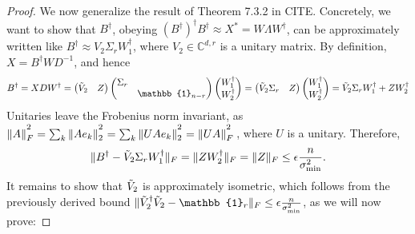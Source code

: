 \begin{proof}
We now generalize the result of Theorem 7.3.2 in CITE. Concretely, we want to show that $B^{\dag}$, obeying $(B^{\dag})^{\dag}B^{\dag}\approx X^* = W\Lambda W^{\dag}$, can be approximately written like $B^{\dag}\approx V_2\Sigma_rW_1^{\dag}$, where $V_2\in\mathbb{C}^{d,r}$ is a unitary matrix.
By definition, $X=B^{\dag}WD^{-1}$, and hence
\begin{equation*}
B^{\dag}=XDW^{\dag} = 
\begin{pmatrix}
\Tilde{V}_2 & Z
\end{pmatrix}
\begin{pmatrix}
\Sigma_r &\\
& \mathbb{1}_{n-r}
\end{pmatrix}
\begin{pmatrix}
W_1^{\dag} \\ W_2^{\dag}
\end{pmatrix} = 
\begin{pmatrix}
\Tilde{V}_2 \Sigma_r & Z
\end{pmatrix}
\begin{pmatrix}
W_1^{\dag} \\ W_2^{\dag}
\end{pmatrix} = \Tilde{V}_2\Sigma_r W_1^{\dag} + ZW_2^{\dag}
\end{equation*}
Unitaries leave the Frobenius norm invariant, as $\|A\|_F^{\textstyle ^2}=\sum_k\|Ae_k\|_2^{\textstyle ^2} = \sum_k \|UAe_k\|_2^{\textstyle ^2}=\|UA\|_F^{\textstyle ^2}\thinspace$, where $U$ is a unitary. Therefore,
\begin{equation*}
\|B^{\dag}-\Tilde{V}_2\Sigma_r W_1^{\dag}\|_F=\|ZW_2^{\dag}\|_F=\|Z\|_F\leq\epsilon \frac{n}{\sigma_{\text{min}}^2}.
\end{equation*}
It remains to show that $\Tilde{V}_2$ is approximately isometric, which follows from the previously derived bound $\|\Tilde{V}_2^{\dag}\Tilde{V}_2 -\mathbb{1}_r\|_F\leq\epsilon\frac{n}{\sigma_{\text{min}}^2}$, as we will now prove:


\end{proof}
